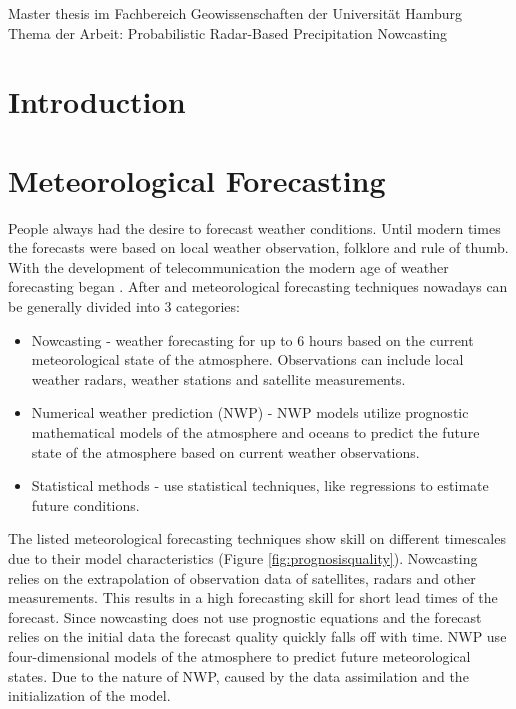 \documentclass[11pt,twoside,a4paper,fleqn,x11names]{report}
\numberwithin{equation}{chapter}
\numberwithin{figure}{chapter}
\numberwithin{table}{chapter}
\begin{document}
	\newpage
	\thispagestyle{empty}
	\null
	\vfill
	Master thesis im Fachbereich Geowissenschaften der Universität Hamburg\\
	Thema der Arbeit: \glqq Probabilistic Radar-Based Precipitation Nowcasting\grqq
	
	
\newpage
\renewcommand{\abstractname}{\huge \flushleft Abstract}
\begin{abstract}
\null
\end{abstract}
\thispagestyle{empty}
\pagestyle{empty}
\tableofcontents
\listoffigures
\listoftables
\newpage\pagestyle{fancy}
\chapter{Introduction}
\chapter{Meteorological Forecasting}
People always had the desire to forecast weather conditions. Until modern times the forecasts were based on local weather observation, folklore and rule of thumb. With the development of telecommunication the modern age of weather forecasting began \citep{Moore}. After \cite{Sene2009} and \cite{Pierce12} meteorological forecasting techniques nowadays can be generally divided into 3 categories:
\begin{itemize}
	\item Nowcasting - weather forecasting for up to 6 hours based on the current meteorological state of the atmosphere. Observations can include local weather radars, weather stations and satellite measurements.
	\item Numerical weather prediction (NWP) - NWP models utilize prognostic mathematical models of the atmosphere and oceans to predict the future state of the atmosphere based on current weather observations.
	\item Statistical methods - use statistical techniques, like regressions to estimate future conditions.
\end{itemize}
The listed meteorological forecasting techniques show skill on different timescales due to their model characteristics (Figure \ref{fig:prognosisquality}). Nowcasting relies on the extrapolation of observation data of satellites, radars and other measurements. This results in a high forecasting skill for short lead times of the forecast. Since nowcasting does not use prognostic equations and the forecast relies on the initial data the forecast quality quickly falls off with time. NWP use four-dimensional models of the atmosphere to predict future meteorological states. Due to the nature of NWP, caused by the data assimilation and the initialization of the model.
\end{document}
